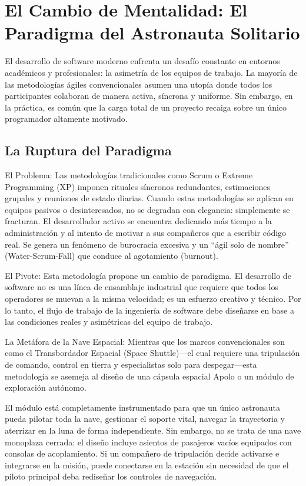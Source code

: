 \documentclass[14pt,a4paper,oneside]{extbook}
\begin{document}
\chapter{El Cambio de Mentalidad: El Paradigma del Astronauta Solitario}

El desarrollo de software moderno enfrenta un desafío constante en entornos académicos y profesionales: la asimetría de los equipos de trabajo. La mayoría de las metodologías ágiles convencionales asumen una utopía donde todos los participantes colaboran de manera activa, síncrona y uniforme. Sin embargo, en la práctica, es común que la carga total de un proyecto recaiga sobre un único programador altamente motivado.

\section{La Ruptura del Paradigma}

El Problema: Las metodologías tradicionales como Scrum o Extreme Programming (XP) imponen rituales síncronos redundantes, estimaciones grupales y reuniones de estado diarias. Cuando estas metodologías se aplican en equipos pasivos o desinteresados, no se degradan con elegancia: simplemente se fracturan. El desarrollador activo se encuentra dedicando más tiempo a la administración y al intento de motivar a sus compañeros que a escribir código real. Se genera un fenómeno de burocracia excesiva y un \enquote{ágil solo de nombre} (Water-Scrum-Fall) que conduce al agotamiento (burnout).

El Pivote: Esta metodología propone un cambio de paradigma. El desarrollo de software no es una línea de ensamblaje industrial que requiere que todos los operadores se muevan a la misma velocidad; es un esfuerzo creativo y técnico. Por lo tanto, el flujo de trabajo de la ingeniería de software debe diseñarse en base a las condiciones reales y asimétricas del equipo de trabajo.

La Metáfora de la Nave Espacial: Mientras que los marcos convencionales son como el Transbordador Espacial (Space Shuttle)---el cual requiere una tripulación de comando, control en tierra y especialistas solo para despegar---esta metodología se asemeja al diseño de una cápsula espacial Apolo o un módulo de exploración autónomo.

El módulo está completamente instrumentado para que un único astronauta pueda pilotar toda la nave, gestionar el soporte vital, navegar la trayectoria y aterrizar en la luna de forma independiente. Sin embargo, no se trata de una nave monoplaza cerrada: el diseño incluye asientos de pasajeros vacíos equipados con consolas de acoplamiento. Si un compañero de tripulación decide activarse e integrarse en la misión, puede conectarse en la estación sin necesidad de que el piloto principal deba rediseñar los controles de navegación.
\end{document}
